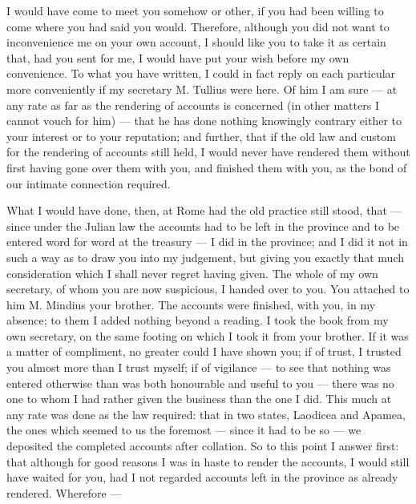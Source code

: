 

 I would have come to meet you somehow or other, if you had been willing to come where you had said you would. Therefore, although you did not want to inconvenience me on your own account, I should like you to take it as certain that, had you sent for me, I would have put your wish before my own convenience. To what you have written, I could in fact reply on each particular more conveniently if my secretary M. Tullius were here. Of him I am sure --- at any rate as far as the rendering of accounts is concerned (in other matters I cannot vouch for him) --- that he has done nothing knowingly contrary either to your interest or to your reputation; and further, that if the old law and custom for the rendering of accounts still held, I would never have rendered them without first having gone over them with you, and finished them with you, as the bond of our intimate connection required.

 What I would have done, then, at Rome had the old practice still stood, that --- since under the Julian law the accounts had to be left in the province and to be entered word for word at the treasury --- I did in the province; and I did it not in such a way as to draw you into my judgement, but giving you exactly that much consideration which I shall never regret having given. The whole of my own secretary, of whom you are now suspicious, I handed over to you. You attached to him M. Mindius your brother. The accounts were finished, with you, in my absence; to them I added nothing beyond a reading. I took the book from my own secretary, on the same footing on which I took it from your brother. If it was a matter of compliment, no greater could I have shown you; if of trust, I trusted you almost more than I trust myself; if of vigilance --- to see that nothing was entered otherwise than was both honourable and useful to you --- there was no one to whom I had rather given the business than the one I did. This much at any rate was done as the law required: that in two states, Laodicea and Apamea, the ones which seemed to us the foremost --- since it had to be so --- we deposited the completed accounts after collation. So to this point I answer first: that although for good reasons I was in haste to render the accounts, I would still have waited for you, had I not regarded accounts left in the province as already rendered. Wherefore ---

